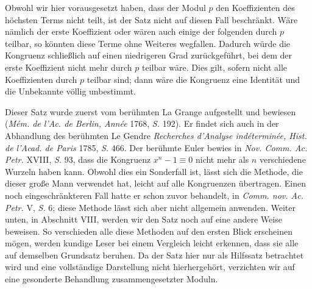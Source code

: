 

Obwohl wir hier vorausgesetzt haben, dass der Modul $p$ den Koeffizienten des höchsten Terms nicht teilt, ist der Satz nicht auf diesen Fall beschränkt. Wäre nämlich der erste Koeffizient oder wären auch einige der folgenden durch $p$ teilbar, so könnten diese Terme ohne Weiteres wegfallen. Dadurch würde die Kongruenz schließlich auf einen niedrigeren Grad zurückgeführt, bei dem der erste Koeffizient nicht mehr durch $p$ teilbar wäre. Dies gilt, sofern nicht alle Koeffizienten durch $p$ teilbar sind; dann wäre die Kongruenz eine Identität und die Unbekannte völlig unbestimmt.

Dieser Satz wurde zuerst vom berühmten La Grange aufgestellt und bewiesen (\emph{M\'em. de l'Ac. de Berlin, Ann\'ee} 1768, \emph{S.} 192). Er findet sich auch in der Abhandlung des berühmten Le Gendre \emph{Recherches d'Analyse ind\'etermin\'ee, Hist. de l'Acad. de Paris} 1785, \emph{S.} 466. Der berühmte Euler bewies in \emph{Nov. Comm. Ac. Petr.} XVIII, \emph{S.} 93, dass die Kongruenz $x^n-1\equiv0$ nicht mehr als $n$ verschiedene Wurzeln haben kann. Obwohl dies ein Sonderfall ist, lässt sich die Methode, die dieser große Mann verwendet hat, leicht auf alle Kongruenzen übertragen. Einen noch eingeschränkteren Fall hatte er schon zuvor behandelt, in \emph{Comm. nov. Ac. Petr.} V, \emph{S.} 6; diese Methode lässt sich aber nicht allgemein anwenden. Weiter unten, in Abschnitt VIII, werden wir den Satz noch auf eine andere Weise beweisen. So verschieden alle diese Methoden auf den ersten Blick erscheinen mögen, werden kundige Leser bei einem Vergleich leicht erkennen, dass sie alle auf demselben Grundsatz beruhen. Da der Satz hier nur als Hilfssatz betrachtet wird und eine vollständige Darstellung nicht hierhergehört, verzichten wir auf eine gesonderte Behandlung zusammengesetzter Moduln.

